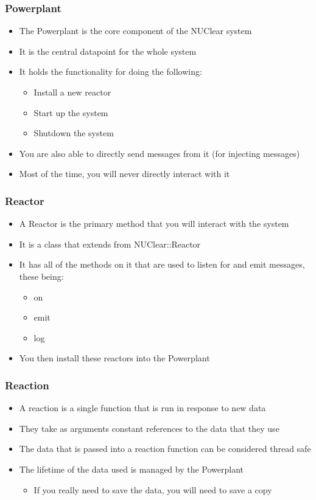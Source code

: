 \documentclass{beamer}
\begin{document}
\begin{frame}
	\frametitle{Powerplant}
	\begin{itemize}
		\item The Powerplant is the core component of the NUClear system
		\item It is the central datapoint for the whole system
		\item It holds the functionality for doing the following:
			\begin{itemize}
				\item Install a new reactor
				\item Start up the system
				\item Shutdown the system
			\end{itemize}
		\item You are also able to directly send messages from it (for injecting messages)
		\item Most of the time, you will never directly interact with it
	\end{itemize}
\end{frame}

\begin{frame}
	\frametitle{Reactor}
	\begin{itemize}
		\item A Reactor is the primary method that you will interact with the system
		\item It is a class that extends from NUClear::Reactor
		\item It has all of the methods on it that are used to listen for and emit messages, these being:
			\begin{itemize}
				\item on
				\item emit
				\item log
			\end{itemize}
		\item You then install these reactors into the Powerplant
	\end{itemize}
\end{frame}

\begin{frame}
	\frametitle{Reaction}
	\begin{itemize}
		\item A reaction is a single function that is run in response to new data
		\item They take as arguments constant references to the data that they use
		\item The data that is passed into a reaction function can be considered thread safe
		\item The lifetime of the data used is managed by the Powerplant
			\begin{itemize}
				\item If you really need to save the data, you will need to save a copy
			\end{itemize}
	\end{itemize}
\end{frame}
\end{document}
